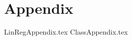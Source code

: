 \documentclass[
	letterpaper,
	a4paper,
	cleardoublepage=empty,
	headings=twolinechapter,
	numbers=autoenddot,
]{article}
\newcounter{appendix}
\begin{document}
				
	\appendix
	
	\section*{Appendix}
	\label{appendix:app}
	
	{LinRegAppendix.tex}
	{ClassAppendix.tex}
	
	
	
	
	
	
	
\end{document}
